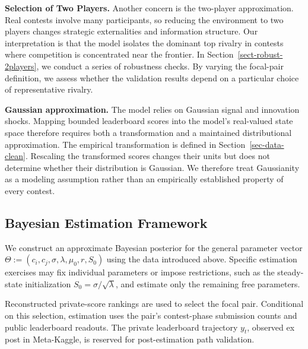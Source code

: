 \documentclass[mnsc]{informs3}
\begin{document}
\textbf{Selection of Two Players.}
Another concern is the two-player approximation.
Real contests involve many participants, so reducing the environment to two players changes strategic externalities and information structure.
Our interpretation is that the model isolates the dominant top rivalry in contests where competition is concentrated near the frontier.
In Section~\ref{sect-robust-2players}, we conduct a series of robustness checks.
By varying the focal-pair definition, we assess whether the validation results depend on a particular choice of representative rivalry.

\textbf{Gaussian approximation.}
The model relies on Gaussian signal and innovation shocks. Mapping bounded leaderboard scores into the model's real-valued state space therefore requires both a transformation and a maintained distributional approximation. The empirical transformation is defined in Section~\ref{sec-data-clean}. Rescaling the transformed scores changes their units but does not determine whether their distribution is Gaussian. We therefore treat Gaussianity as a modeling assumption rather than an empirically established property of every contest.



\subsection{Bayesian Estimation Framework}

{We construct an approximate Bayesian posterior for the general parameter vector $\Theta:=(c_i,c_j,\sigma,\lambda,\mu_0,r,S_0)$ using the data introduced above. Specific estimation exercises may fix individual parameters or impose restrictions, such as the steady-state initialization $S_0=\sigma/\sqrt\lambda$, and estimate only the remaining free parameters.}

{Reconstructed private-score rankings are used to select the focal pair. Conditional on this selection, estimation uses the pair's contest-phase submission counts and public leaderboard readouts. The private leaderboard trajectory $y_t$, observed ex post in Meta-Kaggle, is reserved for post-estimation path validation.}
\end{document}
